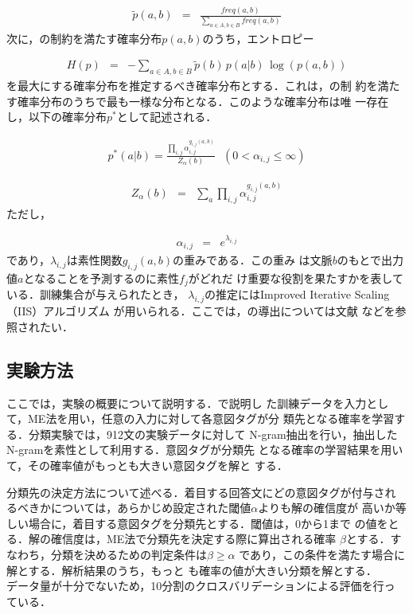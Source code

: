 \begin{eqnarray*}
\tilde{p}(a,b) &= &\frac{freq(a,b)}{\sum_{a \in A,b \in B}freq(a,b)}
\end{eqnarray*}
次に，の制約を満たす確率分布$p(a,b)$のうち，エントロピー

\begin{eqnarray*}
H(p) &= &-\sum_{a \in A, b \in B}\tilde{p}(b)\,p(a|b)\,\log(p(a,b))
\end{eqnarray*}
を最大にする確率分布を推定するべき確率分布とする．これは，の制
約を満たす確率分布のうちで最も一様な分布となる．このような確率分布は唯
一存在し，以下の確率分布$p^{\ast}$として記述される．

\begin{eqnarray}
p^{\ast}(a|b) =
\frac{\prod_{i,j}\alpha_{i,j}^{g_{i,j}(a,b)}}{Z_{\alpha}(b)}~~~(0<\alpha_{i,j}\le\infty)
\label{eq:eq8}
\end{eqnarray}

\begin{eqnarray*}
Z_{\alpha}(b) &= &\sum_{a}\prod_{i,j}\alpha_{i,j}^{g_{i,j}(a,b)}
\end{eqnarray*}
ただし，

\begin{eqnarray*}
\alpha_{i,j} &= &e^{\lambda_{i,j}}
\end{eqnarray*}
であり，$\lambda_{i,j}$は素性関数$g_{i,j}(a,b)$の重みである．この重み
は文脈$b$のもとで出力値$a$となることを予測するのに素性$f_{j}$がどれだ
け重要な役割を果たすかを表している．訓練集合が与えられたとき，
$\lambda_{i,j}$の推定にはImproved Iterative Scaling（IIS）アルゴリズム
\cite{pietra:95}が用いられる．ここでは，の導出については文献
\cite{berger:96,jaynes:59,jaynes:79}などを参照されたい．

\subsection{実験方法}

ここでは，実験の概要について説明する．で説明し
た訓練データを入力として，ME法を用い，任意の入力に対して各意図タグが分
類先となる確率を学習する．分類実験では，912文の実験データに対して
N-gram抽出を行い，抽出したN-gramを素性として利用する．意図タグが分類先
となる確率の学習結果を用いて，その確率値がもっとも大きい意図タグを解と
する．

分類先の決定方法について述べる．着目する回答文にどの意図タグが付与され
るべきかについては，あらかじめ設定された閾値$\alpha$よりも解の確信度が
高いか等しい場合に，着目する意図タグを分類先とする．閾値は，0から1まで
の値をとる．解の確信度は，ME法で分類先を決定する際に算出される確率
$\beta$とする．すなわち，分類を決めるための判定条件は$\beta \ge
\alpha$ であり，この条件を満たす場合に解とする．解析結果のうち，もっと
も確率の値が大きい分類を解とする．\\
データ量が十分でないため，10分割のクロスバリデーションによる評価を行っ
ている．

